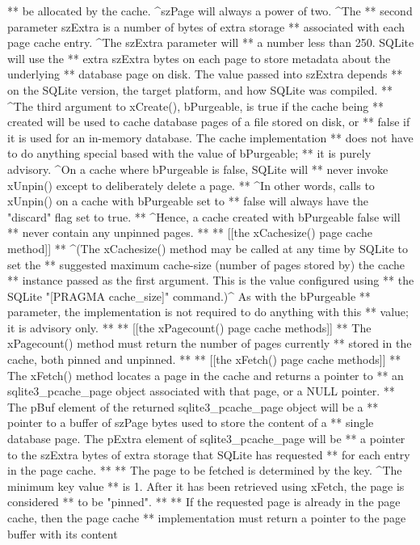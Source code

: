 \begin{Codex}[label=sqlite3.h,numbers=left]
{** be allocated by the cache.  ^szPage will always a power of two.  ^The
** second parameter szExtra is a number of bytes of extra storage 
** associated with each page cache entry.  ^The szExtra parameter will
** a number less than 250.  SQLite will use the
** extra szExtra bytes on each page to store metadata about the underlying
** database page on disk.  The value passed into szExtra depends
** on the SQLite version, the target platform, and how SQLite was compiled.
** ^The third argument to xCreate(), bPurgeable, is true if the cache being
** created will be used to cache database pages of a file stored on disk, or
** false if it is used for an in-memory database. The cache implementation
** does not have to do anything special based with the value of bPurgeable;
** it is purely advisory.  ^On a cache where bPurgeable is false, SQLite will
** never invoke xUnpin() except to deliberately delete a page.
** ^In other words, calls to xUnpin() on a cache with bPurgeable set to
** false will always have the "discard" flag set to true.  
** ^Hence, a cache created with bPurgeable false will
** never contain any unpinned pages.
**
** [[the xCachesize() page cache method]]
** ^(The xCachesize() method may be called at any time by SQLite to set the
** suggested maximum cache-size (number of pages stored by) the cache
** instance passed as the first argument. This is the value configured using
** the SQLite "[PRAGMA cache_size]" command.)^  As with the bPurgeable
** parameter, the implementation is not required to do anything with this
** value; it is advisory only.
**
** [[the xPagecount() page cache methods]]
** The xPagecount() method must return the number of pages currently
** stored in the cache, both pinned and unpinned.
** 
** [[the xFetch() page cache methods]]
** The xFetch() method locates a page in the cache and returns a pointer to 
** an sqlite3_pcache_page object associated with that page, or a NULL pointer.
** The pBuf element of the returned sqlite3_pcache_page object will be a
** pointer to a buffer of szPage bytes used to store the content of a 
** single database page.  The pExtra element of sqlite3_pcache_page will be
** a pointer to the szExtra bytes of extra storage that SQLite has requested
** for each entry in the page cache.
**
** The page to be fetched is determined by the key. ^The minimum key value
** is 1.  After it has been retrieved using xFetch, the page is considered
** to be "pinned".
**
** If the requested page is already in the page cache, then the page cache
** implementation must return a pointer to the page buffer with its content
}
\end{Codex}
